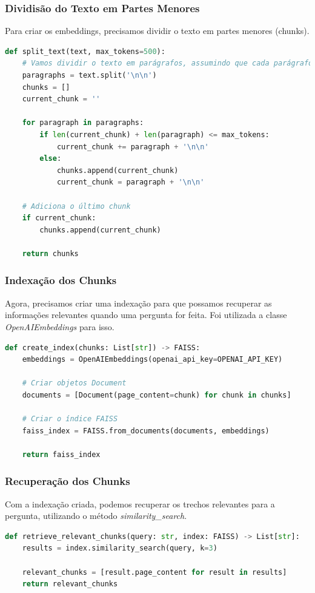 \documentclass[12 pt]{article}
\begin{document}
\subsubsection*{Dividisão do Texto em Partes Menores}
Para criar os embeddings, precisamos dividir o texto em partes menores (chunks).
\begin{lstlisting}[language=Python]
def split_text(text, max_tokens=500):
    # Vamos dividir o texto em parágrafos, assumindo que cada parágrafo seja pequeno o suficiente.
    paragraphs = text.split('\n\n')
    chunks = []
    current_chunk = ''
    
    for paragraph in paragraphs:
        if len(current_chunk) + len(paragraph) <= max_tokens:
            current_chunk += paragraph + '\n\n'
        else:
            chunks.append(current_chunk)
            current_chunk = paragraph + '\n\n'
    
    # Adiciona o último chunk
    if current_chunk:
        chunks.append(current_chunk)
    
    return chunks
\end{lstlisting}
\subsubsection*{Indexação dos Chunks}
Agora, precisamos criar uma indexação para que possamos recuperar as informações relevantes quando uma pergunta for feita. Foi utilizada a classe \textit{OpenAIEmbeddings} para isso.
\begin{lstlisting}[language=Python]
def create_index(chunks: List[str]) -> FAISS:
    embeddings = OpenAIEmbeddings(openai_api_key=OPENAI_API_KEY)
    
    # Criar objetos Document
    documents = [Document(page_content=chunk) for chunk in chunks]
    
    # Criar o índice FAISS
    faiss_index = FAISS.from_documents(documents, embeddings)
    
    return faiss_index
\end{lstlisting}
\subsubsection*{Recuperação dos Chunks}
Com a indexação criada, podemos recuperar os trechos relevantes para a pergunta, utilizando o método \textit{similarity\_search}.
\begin{lstlisting}[language=Python]
def retrieve_relevant_chunks(query: str, index: FAISS) -> List[str]:
    results = index.similarity_search(query, k=3)
    
    relevant_chunks = [result.page_content for result in results]
    return relevant_chunks
\end{lstlisting}
\end{document}
